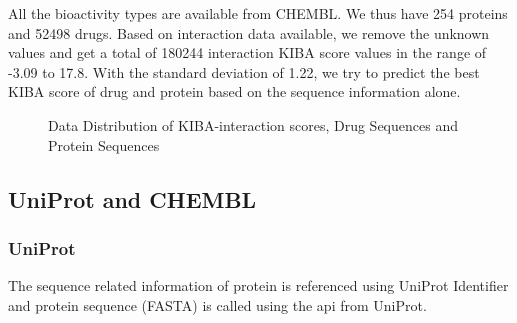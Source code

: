 All the bioactivity types are available from CHEMBL.\cite{Gaulton2017} We thus have 254 proteins and 52498 drugs. Based on interaction data available, we remove the unknown values and get a total of 180244 interaction KIBA score values in the range of -3.09 to 17.8. With the standard deviation of 1.22, we try to predict the best KIBA score of drug and protein based on the sequence information alone.
\begin{figure}
  \centering 
         \caption{Data Distribution of KIBA-interaction scores, Drug Sequences and Protein Sequences}
         \label{fig:kiba_drug_protein}
\end{figure}

\subsection{UniProt and CHEMBL }

\subsubsection{UniProt} 
The sequence related information of protein is referenced using UniProt Identifier and protein sequence (FASTA) is called using the api from UniProt. \cite{UniProtConsortium2018}



